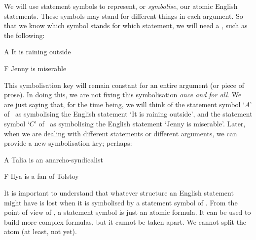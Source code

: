 \documentclass[PHIL101-Textbook.tex]{subfiles}
\begin{document}
We will use statement symbols to represent, or \emph{symbolise}, our atomic English statements. These symbols may stand for different things in each argument. So that we know which symbol stands for which statement, we will need a , such as the following:
	\begin{ekey}
		\item[A] It is raining outside
		\item[F] Jenny is miserable
	\end{ekey}
This symbolisation key will remain constant for an entire argument (or piece of prose).  In doing this, we are not fixing this symbolisation \emph{once and for all}. We are just saying that, for the time being, we will think of the statement symbol `$A$' of \tfl\ as symbolising the English statement `It is raining outside', and the statement symbol `$C$' of \tfl\ as symbolising the English statement `Jenny is miserable'. Later, when we are dealing with different statements or different arguments, we can provide a new symbolisation key; perhaps:
	\begin{ekey}
		\item[A] Talia is an anarcho-syndicalist
		\item[F] Ilya is a fan of Tolstoy
	\end{ekey}
It is important to understand that whatever structure an English statement might have is lost when it is symbolised by a statement symbol of \tfl. From the point of view of \tfl, a statement symbol is just an atomic formula. It can be used to build more complex formulas, but it cannot be taken apart. We cannot split the atom (at least, not yet).
\end{document}
